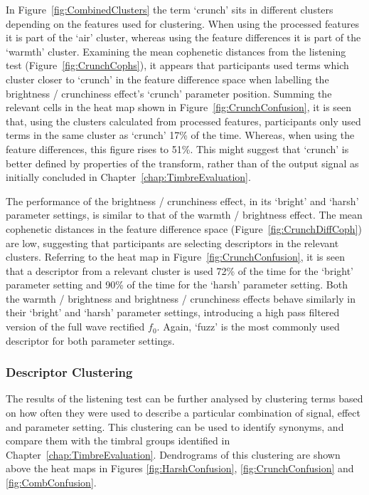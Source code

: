 			In Figure~\ref{fig:CombinedClusters} the term `crunch' sits in different clusters depending on the
			features used for clustering. When using the processed features it is part of the `air' cluster,
			whereas using the feature differences it is part of the `warmth' cluster. Examining the mean
			cophenetic distances from the listening test (Figure~\ref{fig:CrunchCophs}), it appears that
			participants used terms which cluster closer to `crunch' in the feature difference space when
			labelling the brightness / crunchiness effect's `crunch' parameter position. Summing the relevant
			cells in the heat map shown in Figure~\ref{fig:CrunchConfusion}, it is seen that, using the
			clusters calculated from processed features, participants only used terms in the same cluster as
			`crunch' 17\% of the time. Whereas, when using the feature differences, this figure rises to 51\%.
			This might suggest that `crunch' is better defined by properties of the transform, rather than of
			the output signal as initially concluded in Chapter~\ref{chap:TimbreEvaluation}.

			The performance of the brightness / crunchiness effect, in its `bright' and `harsh' parameter
			settings, is similar to that of the warmth / brightness effect. The mean cophenetic distances in
			the feature difference space (Figure~\ref{fig:CrunchDiffCoph}) are low, suggesting that
			participants are selecting descriptors in the relevant clusters. Referring to the heat map in
			Figure~\ref{fig:CrunchConfusion}, it is seen that a descriptor from a relevant cluster is used 72\%
			of the time for the `bright' parameter setting and 90\% of the time for the `harsh' parameter
			setting.  Both the warmth / brightness and brightness / crunchiness effects behave similarly in
			their `bright' and `harsh' parameter settings, introducing a high pass filtered version of the full
			wave rectified $f_{0}$. Again, `fuzz' is the most commonly used descriptor for both parameter
			settings.

		\subsubsection*{Descriptor Clustering}
			The results of the listening test can be further analysed by clustering terms based on how often
			they were used to describe a particular combination of signal, effect and parameter setting. This
			clustering can be used to identify synonyms, and compare them with the timbral groups identified in
			Chapter~\ref{chap:TimbreEvaluation}. Dendrograms of this clustering are shown above the heat maps
			in Figures \ref{fig:HarshConfusion}, \ref{fig:CrunchConfusion} and \ref{fig:CombConfusion}.

